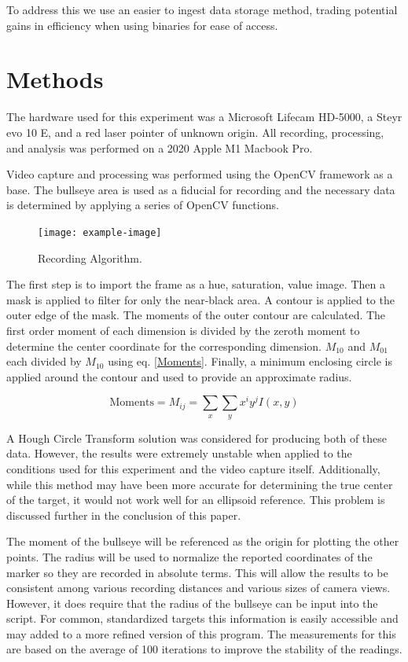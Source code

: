 \documentclass[conference]{IEEEtran}
\begin{document}
To address this we use an easier to ingest data storage method, trading potential gains in efficiency when using binaries for ease of access.


\section{Methods}

The hardware used for this experiment was 
a Microsoft Lifecam HD-5000,
a Steyr evo 10 E,
and a red laser pointer of unknown origin.
All recording, processing, and analysis was performed on 
a 2020 Apple M1 Macbook Pro.

Video capture and processing was performed using the 
OpenCV \cite{itseez2015opencv} framework as a base.
The bullseye area is used as a fiducial for recording and 
the necessary data is determined by applying a series of OpenCV functions.

\begin{figure}[]
	\centering
	\texttt{[image: example-image]}
	\caption{Recording Algorithm.}
	\label{fig:capture_algorithm}
\end{figure}

The first step is to import the frame as a hue, saturation, value image.
Then a mask is applied to filter for only the near-black area.
A contour is applied to the outer edge of the mask.
The moments of the outer contour are calculated.
The first order moment of each dimension is divided by the zeroth moment to determine the center coordinate for the corresponding dimension.
$M_{10}$ and $M_{01}$ each divided by $M_{10}$ using eq. \eqref{Moments}.
Finally, a minimum enclosing circle is applied around the contour and used to provide an approximate radius.

\begin{equation}\label{Moments}
	\text{Moments} = M_{ij} = \sum_{x} \sum_{y} x^i y^j I(x,y)
\end{equation}

A Hough Circle Transform solution \cite{Hough1964} was considered for producing both of these data.
However, the results were extremely unstable when applied to the conditions used for this experiment and the video capture itself.
Additionally, while this method may have been more accurate for determining the true center of the target, it would not work well for an ellipsoid reference.
This problem is discussed further in the conclusion of this paper.

The moment of the bullseye will be referenced as the origin for plotting the other points. 
The radius will be used to normalize the reported coordinates of the marker so they are recorded in absolute terms.
This will allow the results to be consistent among various recording distances and various sizes of camera views.
However, it does require that the radius of the bullseye can be input into the script.
For common, standardized targets this information is easily accessible
\cite{issfRules} and may added to a more refined version of this program.
The measurements for this are based on the average of 100 iterations to improve the stability of the readings.
\end{document}

